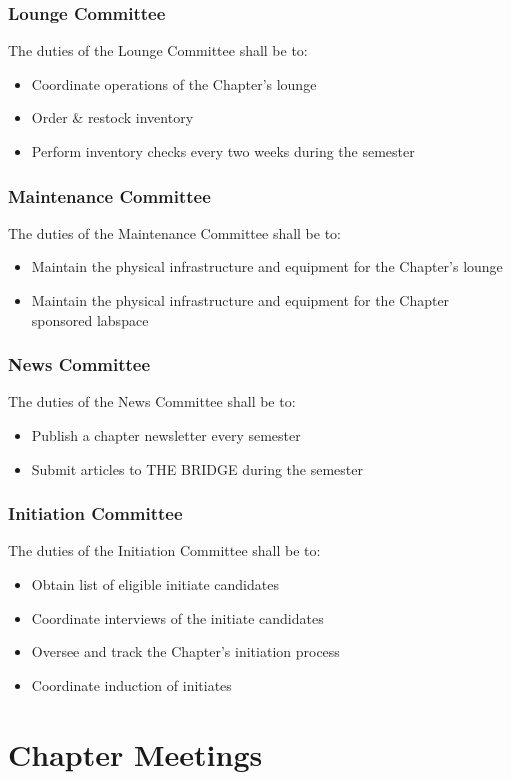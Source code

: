 \documentclass[10pt, oneside]{article}
\begin{document}
\subsubsection{Lounge Committee}
The duties of the Lounge Committee shall be to:
\begin{itemize}
\item Coordinate operations of the Chapter’s lounge
\item Order \& restock inventory
\item Perform inventory checks every two weeks during the semester
\end{itemize}
\subsubsection{Maintenance Committee}
The duties of the Maintenance Committee shall be to:
\begin{itemize}
\item Maintain the physical infrastructure and equipment for the Chapter’s lounge
\item Maintain the physical infrastructure and equipment for the Chapter sponsored
labspace
\end{itemize}
\subsubsection{News Committee}
The duties of the News Committee shall be to:
\begin{itemize}
\item Publish a chapter newsletter every semester
\item Submit articles to THE BRIDGE during the semester
\end{itemize}
\subsubsection{Initiation Committee}
The duties of the Initiation Committee shall be to:
\begin{itemize}
\item Obtain list of eligible initiate candidates
\item Coordinate interviews of the initiate candidates
\item Oversee and track the Chapter’s initiation process
\item Coordinate induction of initiates
\end{itemize}

\section{Chapter Meetings}
\end{document}
